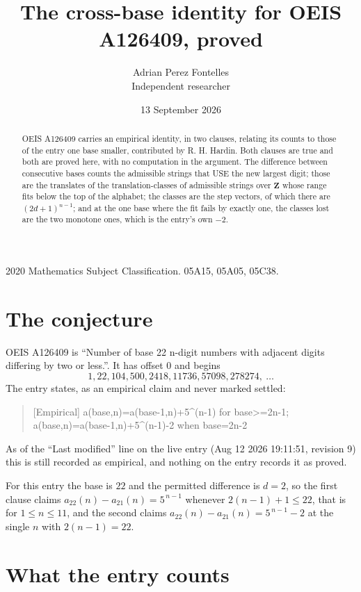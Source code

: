 \documentclass[11pt,a4paper]{article}
\title{The cross-base identity for OEIS A126409, proved}
\author{Adrian Perez Fontelles\\ \small Independent researcher}
\date{13 September 2026}
\theoremstyle{plain}
\theoremstyle{definition}
\begin{document}
\maketitle

\begin{abstract}
OEIS A126409 carries an empirical identity, in two clauses, relating its counts to those of the
entry one base smaller, contributed by R. H. Hardin. Both clauses are true and both are proved
here, with no computation in the argument. The difference between consecutive bases counts the
admissible strings that USE the new largest digit; those are the translates of the
translation-classes of admissible strings over $\mathbf{Z}$ whose range fits below the top of
the alphabet; the classes are the step vectors, of which there are $(2d+1)^{n-1}$; and at the
one base where the fit fails by exactly one, the classes lost are the two monotone ones, which
is the entry's own $-2$.
\end{abstract}

\noindent\small 2020 Mathematics Subject Classification. 05A15, 05A05, 05C38.\normalsize

\section{The conjecture}

OEIS A126409 is ``Number of base 22 n-digit numbers with adjacent digits differing by two or less.''. It has offset $0$ and begins
\[
1, 22, 104, 500, 2418, 11736, 57098, 278274,\ \dots
\]
The entry states, as an empirical claim and never marked settled:
\begin{quote}
[Empirical] a(base,n)=a(base-1,n)+5\textasciicircum{}(n-1) for base>=2n-1; a(base,n)=a(base-1,n)+5\textasciicircum{}(n-1)-2 when base=2n-2
\end{quote}
As of the ``Last modified'' line on the live entry (Aug 12 2026 19:11:51, revision 9)
this is still recorded as empirical, and nothing on the entry records it as proved.

For this entry the base is $22$ and the permitted difference is $d=2$, so the first clause
claims $a_{22}(n)-a_{21}(n)=5^{\,n-1}$ whenever $2(n-1)+1\le22$, that is for
$1\le n\le11$, and the second claims $a_{22}(n)-a_{21}(n)=5^{\,n-1}-2$ at the single
$n$ with $2(n-1)=22$.

\section{What the entry counts}
\end{document}
